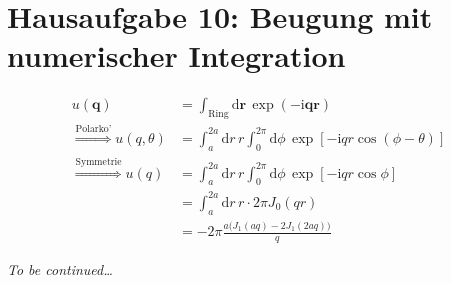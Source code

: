 \documentclass{scrartcl}
\renewcommand{\vec}[1]{\mathbf{#1}}
\renewcommand{\i}{\mathrm{i}}
\begin{document}
\section*{Hausaufgabe 10: Beugung mit numerischer Integration}
\begin{align*}
    u(\vec{q}) &= \int_{\text{Ring}} \mathrm{d}\vec{r}\, \exp(-\i\vec{q}\vec{r}) \\
    \overset{\text{Polarko'}}{\Rightarrow} u(q, \theta) &= \int_a^{2a} \mathrm{d}r\, r \int_0^{2\pi} \mathrm{d}\phi\, \exp[-\i qr \cos(\phi - \theta)] \\
    \overset{\text{Symmetrie}}{\Rightarrow} u(q) &= \int_a^{2a} \mathrm{d}r\, r \int_0^{2\pi} \mathrm{d}\phi\, \exp[-\i qr \cos\phi] \\
    &= \int_a^{2a} \mathrm{d}r\, r \cdot 2\pi J_0(qr) \\
    &= -2\pi \frac{a\big(J_1(aq) - 2J_1(2aq)\big)}{q}
\end{align*}

\emph{To be continued\dots}
\end{document}
